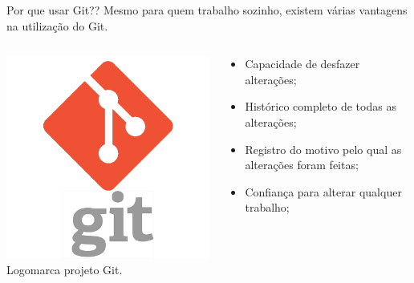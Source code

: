 \documentclass{beamer}
\begin{document}
\begin{frame}{Por que usar Git??}
   Mesmo para quem trabalho sozinho, existem várias vantagens na 
utilização do Git.
  \begin{columns}
    \begin{column}{0.3\textwidth}
       \includegraphics[height=0.4\paperheight]{git_logo.png} \\
       \tiny{Logomarca projeto Git}.
    \end{column}
    \begin{column}{0.5\textwidth}
      \begin{itemize}
        \item Capacidade de desfazer alterações;
	 \item Histórico completo de todas as alterações;
	 \item Registro do motivo pelo qual as alterações foram feitas;
	 \item Confiança para alterar qualquer trabalho;
      \end{itemize} 
    \end{column}    
  \end{columns}
\end{frame}
\end{document}
